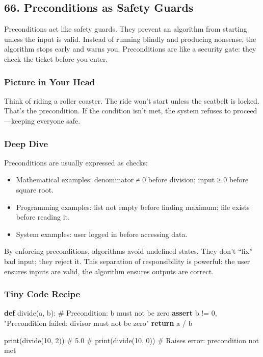 \documentclass[
  letterpaper,
  DIV=11,
  numbers=noendperiod]{scrreprt}
\newenvironment{Shaded}{\begin{snugshade}}{\end{snugshade}}
\newcommand{\BuiltInTok}[1]{\textcolor[rgb]{0.00,0.23,0.31}{#1}}
\newcommand{\CommentTok}[1]{\textcolor[rgb]{0.37,0.37,0.37}{#1}}
\newcommand{\ControlFlowTok}[1]{\textcolor[rgb]{0.00,0.23,0.31}{\textbf{#1}}}
\newcommand{\DecValTok}[1]{\textcolor[rgb]{0.68,0.00,0.00}{#1}}
\newcommand{\KeywordTok}[1]{\textcolor[rgb]{0.00,0.23,0.31}{\textbf{#1}}}
\newcommand{\NormalTok}[1]{\textcolor[rgb]{0.00,0.23,0.31}{#1}}
\newcommand{\OperatorTok}[1]{\textcolor[rgb]{0.37,0.37,0.37}{#1}}
\newcommand{\StringTok}[1]{\textcolor[rgb]{0.13,0.47,0.30}{#1}}
\providecommand{\tightlist}{%
  \setlength{\itemsep}{0pt}\setlength{\parskip}{0pt}}
\begin{document}
\subsection{66. Preconditions as Safety
Guards}\label{preconditions-as-safety-guards}

Preconditions act like safety guards. They prevent an algorithm from
starting unless the input is valid. Instead of running blindly and
producing nonsense, the algorithm stops early and warns you.
Preconditions are like a security gate: they check the ticket before you
enter.

\subsubsection{Picture in Your Head}\label{picture-in-your-head-65}

Think of riding a roller coaster. The ride won't start unless the
seatbelt is locked. That's the precondition. If the condition isn't met,
the system refuses to proceed---keeping everyone safe.

\subsubsection{Deep Dive}\label{deep-dive-35}

Preconditions are usually expressed as checks:

\begin{itemize}
\tightlist
\item
  Mathematical examples: denominator ≠ 0 before division; input ≥ 0
  before square root.
\item
  Programming examples: list not empty before finding maximum; file
  exists before reading it.
\item
  System examples: user logged in before accessing data.
\end{itemize}

By enforcing preconditions, algorithms avoid undefined states. They
don't ``fix'' bad input; they reject it. This separation of
responsibility is powerful: the user ensures inputs are valid, the
algorithm ensures outputs are correct.

\subsubsection{Tiny Code Recipe}\label{tiny-code-recipe-63}

\begin{Shaded}
\begin{Highlighting}[]
\KeywordTok{def}\NormalTok{ divide(a, b):}
    \CommentTok{\# Precondition: b must not be zero}
    \ControlFlowTok{assert}\NormalTok{ b }\OperatorTok{!=} \DecValTok{0}\NormalTok{, }\StringTok{"Precondition failed: divisor must not be zero"}
    \ControlFlowTok{return}\NormalTok{ a }\OperatorTok{/}\NormalTok{ b}

\BuiltInTok{print}\NormalTok{(divide(}\DecValTok{10}\NormalTok{, }\DecValTok{2}\NormalTok{))   }\CommentTok{\# 5.0}
\CommentTok{\# print(divide(10, 0)) \# Raises error: precondition not met}
\end{Highlighting}
\end{Shaded}
\end{document}
